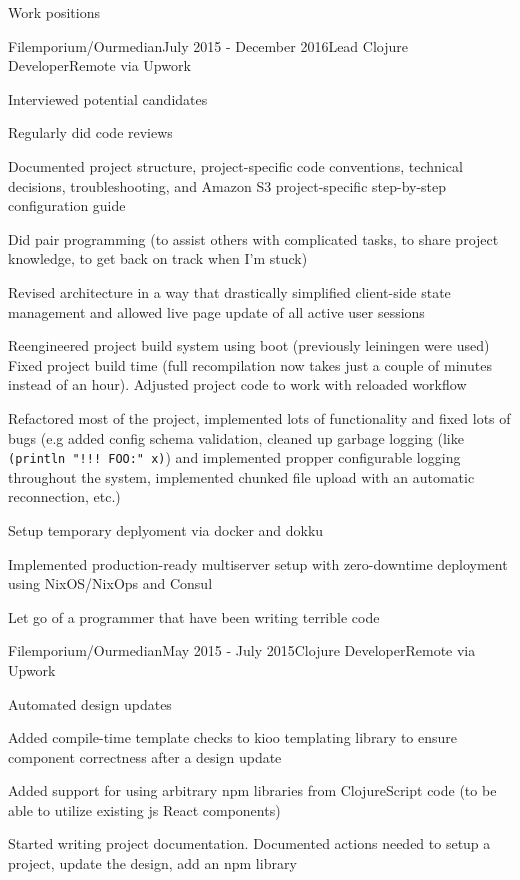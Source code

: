 \documentclass{resume} %
\begin{document}
\begin{rSection}{Work positions}
\begin{rSubsection}{Filemporium/Ourmedian}{July 2015 - December 2016}{Lead Clojure Developer}{Remote via Upwork}
\item Interviewed potential candidates
\item Regularly did code reviews
\item Documented project structure, project-specific code conventions, technical decisions,
  troubleshooting, and Amazon S3 project-specific step-by-step configuration guide
\item Did pair programming (to assist others with complicated tasks, to share project knowledge, to get
  back on track when I'm stuck)
\item Revised architecture in a way that drastically simplified client-side
  state management and allowed live page update of all active user sessions
\item Reengineered project build system using boot (previously leiningen were used)
  Fixed project build time (full recompilation now takes just a couple of minutes
  instead of an hour). Adjusted project code to work with reloaded workflow
\item Refactored most of the project, implemented lots of functionality and fixed lots of bugs (e.g added
  config schema validation, cleaned up garbage logging (like {\tt (println "!!! FOO:" x)}) and implemented
  propper configurable logging throughout the system, implemented chunked file upload with an automatic reconnection, etc.)
\item Setup temporary deplyoment via docker and dokku
\item Implemented production-ready multiserver setup with zero-downtime deployment using NixOS/NixOps and Consul
\item Let go of a programmer that have been writing terrible code
\end{rSubsection}

\begin{rSubsection}{Filemporium/Ourmedian}{May 2015 - July 2015}{Clojure Developer}{Remote via Upwork}
\item Automated design updates
\item Added compile-time template checks to kioo templating library to ensure
  component correctness after a design update
\item Added support for using arbitrary npm libraries from ClojureScript code (to be
  able to utilize existing js React components)
\item Started writing project documentation. Documented actions needed to setup
  a project, update the design, add an npm library


\end{rSubsection}
\end{rSection}
\end{document}
